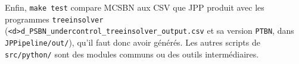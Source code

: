 Enfin, \texttt{make test} compare MCSBN aux CSV que JPP produit avec les programmes \texttt{treeinsolver} (\texttt{<d>d\_PSBN\_undercontrol\_treeinsolver\_output.csv} et sa version \texttt{PTBN}, dans \texttt{JPPipeline/out/}), qu'il faut donc avoir générés.
Les autres scripts de \texttt{src/python/} sont des modules communs ou des outils intermédiaires.
